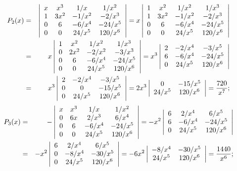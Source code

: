 \documentclass[dvips]{book}
\numberwithin{example}{section}
\numberwithin{equation}{section}
\numberwithin{theorem}{section}
\numberwithin{table}{section}
\numberwithin{figure}{section}
\begin{document}
\begin{eqnarray*}
P_2(x)&=&
\left|\begin{array}{cccc}
x&x^3&1/x&1/x^2\\
1&3x^2&-1/x^2&-2/x^3\\
0&6&-6/x^4&-24/x^5\\
0&0&24/x^5&120/x^6
\end{array}\right|=
x\left|\begin{array}{cccc}
1&x^2&1/x^2&1/x^3\\
1&3x^2&-1/x^2&-2/x^3\\
0&6&-6/x^4&-24/x^5\\
0&0&24/x^5&120/x^6
\end{array}\right|\\
&=&x\left|\begin{array}{cccc}
1&x^2&1/x^2&1/x^3\\
0&2x^2&-2/x^2&-3/x^3\\
0&6&-6/x^4&-24/x^5\\
0&0&24/x^5&120/x^6
\end{array}\right|
=x^3\left|\begin{array}{cccc}
2&-2/x^4&-3/x^5\\
6&-6/x^4&-24/x^5\\
0&24/x^5&120/x^6
\end{array}\right|\\
&=&x^3\left|\begin{array}{cccc}
2&-2/x^4&-3/x^5\\
0&0&-15/x^5\\
0&24/x^5&120/x^6
\end{array}\right|
=2x^3\left|\begin{array}{cccc}
0&-15/x^5\\
24/x^5&120/x^6
\end{array}\right|={720\over x^7};
\end{eqnarray*}
\begin{eqnarray*}
P_3(x)&=&
-\left|\begin{array}{cccc}
x&x^3&1/x&1/x^2\\
0&6x&2/x^3&6/x^4\\
0&6&-6/x^4&-24/x^5\\0&0&24/x^5&120/x^6
\end{array}\right|=
-x^2\left|\begin{array}{cccc}
6&2/x^4&6/x^5\\
6&-6/x^4&-24/x^5\\
0&24/x^5&120/x^6
\end{array}\right|\\
&=&-x^2\left|\begin{array}{cccc}
6&2/x^4&6/x^5\\
0&-8/x^4&-30/x^5\\
0&24/x^5&120/x^6
\end{array}\right|
=-6x^2\left|\begin{array}{cccc}
-8/x^4&-30/x^5\\
24/x^5&120/x^6
\end{array}\right|={1440\over x^6};
\end{eqnarray*}
\end{document}
